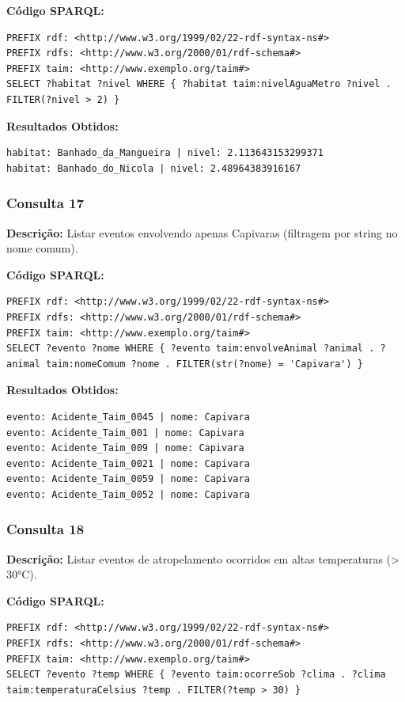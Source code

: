 \documentclass[12pt,a4paper]{article}
\begin{document}
\textbf{Código SPARQL:}
\begin{lstlisting}
PREFIX rdf: <http://www.w3.org/1999/02/22-rdf-syntax-ns#>
PREFIX rdfs: <http://www.w3.org/2000/01/rdf-schema#>
PREFIX taim: <http://www.exemplo.org/taim#>
SELECT ?habitat ?nivel WHERE { ?habitat taim:nivelAguaMetro ?nivel . FILTER(?nivel > 2) }
\end{lstlisting}

\textbf{Resultados Obtidos:}
\begin{lstlisting}
habitat: Banhado_da_Mangueira | nivel: 2.113643153299371
habitat: Banhado_do_Nicola | nivel: 2.48964383916167
\end{lstlisting}

\vspace{1cm}
\subsubsection*{Consulta 17}

\textbf{Descrição:} Listar eventos envolvendo apenas Capivaras (filtragem por string no nome comum).

\textbf{Código SPARQL:}
\begin{lstlisting}
PREFIX rdf: <http://www.w3.org/1999/02/22-rdf-syntax-ns#>
PREFIX rdfs: <http://www.w3.org/2000/01/rdf-schema#>
PREFIX taim: <http://www.exemplo.org/taim#>
SELECT ?evento ?nome WHERE { ?evento taim:envolveAnimal ?animal . ?animal taim:nomeComum ?nome . FILTER(str(?nome) = 'Capivara') }
\end{lstlisting}

\textbf{Resultados Obtidos:}
\begin{lstlisting}
evento: Acidente_Taim_0045 | nome: Capivara
evento: Acidente_Taim_001 | nome: Capivara
evento: Acidente_Taim_009 | nome: Capivara
evento: Acidente_Taim_0021 | nome: Capivara
evento: Acidente_Taim_0059 | nome: Capivara
evento: Acidente_Taim_0052 | nome: Capivara
\end{lstlisting}

\vspace{1cm}
\subsubsection*{Consulta 18}

\textbf{Descrição:} Listar eventos de atropelamento ocorridos em altas temperaturas (> 30°C).

\textbf{Código SPARQL:}
\begin{lstlisting}
PREFIX rdf: <http://www.w3.org/1999/02/22-rdf-syntax-ns#>
PREFIX rdfs: <http://www.w3.org/2000/01/rdf-schema#>
PREFIX taim: <http://www.exemplo.org/taim#>
SELECT ?evento ?temp WHERE { ?evento taim:ocorreSob ?clima . ?clima taim:temperaturaCelsius ?temp . FILTER(?temp > 30) }
\end{lstlisting}
\end{document}
